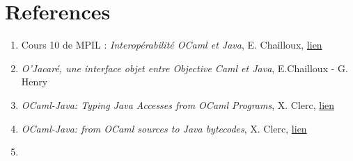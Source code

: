 \documentclass[a4paper, 11pt]{report}
\begin{document}
\section*{References}
\begin{enumerate}
\item Cours 10 de MPIL : \emph{Interopérabilité OCaml et Java}, E. Chailloux,
\href{https://www-licence.ufr-info-p6.jussieu.fr/lmd/licence/2013/ue/LI332-2013oct/public/cours/COURS10.pdf}{lien}
\item \emph{O'Jacaré, une interface objet entre Objective Caml et Java}, E.Chailloux - G. Henry
\item\emph{OCaml-Java: Typing Java Accesses from OCaml Programs}, X. Clerc,
\href{http://www.cs.ru.nl/P.Achten/IFL2013/symposium_proceedings_IFL2013/ifl2013_submission_17.pdf}{lien}
\item \emph{OCaml-Java: from OCaml sources to Java bytecodes}, X. Clerc,
\href{http://www.lexifi.com/ml2012/full9.pd}{lien}
\item
\end{enumerate}
\end{document}
